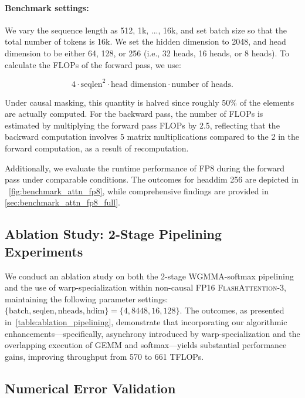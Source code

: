 \begin{enumerate}
\paragraph{Benchmark settings:} We vary the sequence length as 512, 1k, ..., 16k, and set batch size so that the total number of tokens is 16k. We set the hidden dimension to 2048, and head dimension to be either 64, 128, or 256 (i.e., 32 heads, 16 heads, or 8 heads). To calculate the FLOPs of the forward pass, we use:

\begin{equation*}
  4 \cdot \text{seqlen}^2 \cdot \text{head dimension} \cdot \text{number of heads}.
\end{equation*}

Under causal masking, this quantity is halved since roughly 50\% of the elements are actually computed. For the backward pass, the number of FLOPs is estimated by multiplying the forward pass FLOPs by 2.5, reflecting that the backward computation involves 5 matrix multiplications compared to the 2 in the forward computation, as a result of recomputation.

Additionally, we evaluate the runtime performance of FP8 during the forward pass under comparable conditions. The outcomes for headdim 256 are depicted in ~\cref{fig:benchmark_attn_fp8}, while comprehensive findings are provided in \cref{sec:benchmark_attn_fp8_full}.

\subsection{Ablation Study: 2-Stage Pipelining Experiments}
\label{sec:2-stage-pipelining-experiments}

We conduct an ablation study on both the 2-stage WGMMA-softmax pipelining and the use of warp-specialization within non-causal FP16 \textsc{FlashAttention-3}, maintaining the following parameter settings: $\{\text{batch}, \text{seqlen}, \text{nheads}, \text{hdim}\} = \{ 4, 8448, 16, 128\}$. The outcomes, as presented in~\cref{table:ablation_pipelining}, demonstrate that incorporating our algorithmic enhancements—specifically, asynchrony introduced by warp-specialization and the overlapping execution of GEMM and softmax—yields substantial performance gains, improving throughput from 570 to 661 TFLOPs.

\subsection{Numerical Error Validation}
\label{sec:numerical_error}


\end{enumerate}
